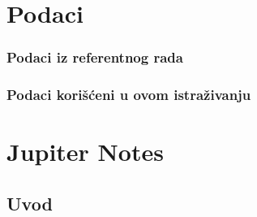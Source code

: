 \documentclass{beamer}
\begin{document}
%

\section{Podaci}

\begin{frame}
  \frametitle{Podaci iz referentnog rada}
\end{frame}


\begin{frame}
  \frametitle{Podaci korišćeni u ovom istraživanju}
\end{frame}


\section{Jupiter Notes}

\subsection{Uvod}
\end{document}
